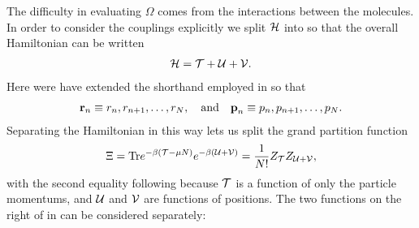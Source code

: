 The difficulty in evaluating $\Omega$ comes from the interactions between the  molecules.
In order to consider the couplings explicitly we split ${\cal H}$ into 
so that the overall Hamiltonian can be written %
\begin{align}
  \H =  %
\KE + \UE + \VE.
\end{align}
Here were have extended the shorthand  employed in   so that 
\begin{align}
{\mathbf{\textbf{r}}}_n \equiv r_n,r_{n+1},\ldots,r_N,  \quad\text{and}\quad
{\mathbf{\textbf{p}}}_n \equiv  p_n,p_{n+1},\ldots, p_N.
\end{align}
Separating the Hamiltonian in this way lets us split the grand partition function
\begin{align}
  \Xi = \textrm{Tr} e^{-\beta ({\cal{T}} -\mu N)}e^{-\beta({\cal{U}} +{\cal{V}})}=  \frac{1}{N!}Z_{\cal{T}} Z_{{\cal{U}}+{\cal{V}}}, \label{eqn:XiSeparate}
\end{align}
with the second equality following because ${\cal{T}}$ is a function of only the particle momentums,
and ${\cal{U}}$ and ${\cal{V}}$ are functions of positions.
The two functions on the right of in   can be considered separately:
